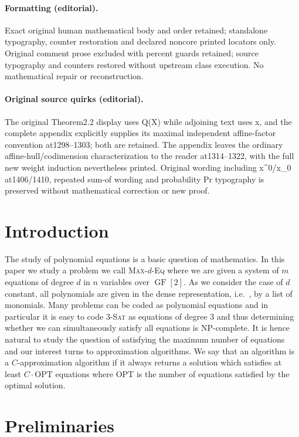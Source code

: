 \documentclass[10pt]{article}
\theoremstyle{definition}
\providecommand{\ie}{i.e.\ }
\numberwithin{equation}{section}
\newcommand{\cclass}[1]{\textsf{#1}}
\newcommand{\GF}{\operatorname{GF}}
\newcommand{\dproblem}[1]{\textsc{#1}}
\begin{document}
\paragraph{Formatting (editorial).} Exact original human mathematical body and order retained; standalone typography, counter restoration and declared noncore printed locators only. Original comment prose excluded with percent guards retained; source typography and counters restored without upstream class execution. No mathematical repair or reconstruction.
\paragraph{Original source quirks (editorial).} The original Theorem2.2 display uses Q(X) while adjoining text uses x, and the complete appendix explicitly supplies its maximal independent affine-factor convention at1298–1303; both are retained. The appendix leaves the ordinary affine-hull/codimension characterization to the reader at1314–1322, with the full new weight induction nevertheless printed. Original wording including x\textasciicircum{}0/x\_0 at1406/1410, repeated sum-of wording and probability Pr typography is preserved without mathematical correction or new proof.
\endgroup
\clearpage
\setcounter{section}{0}
\section{Introduction}

The study of polynomial equations is a basic question
of mathematics.  In this paper we study a problem we
call \dproblem{Max-$d$-Eq}
where we are given a system of $m$ equations of degree
$d$ in $n$ variables over $\GF[2]$.  As we consider the
case of $d$ constant, all polynomials are given in
the dense representation, \ie, by a list of monomials.
Many problems can be coded as polynomial equations and in particular
it is easy to code \dproblem{3-Sat} as equations of degree 3
and thus determining whether we can simultaneously
satisfy all equations is \cclass{NP}-complete.   It is hence
natural to study
the question of satisfying the %
maximum
number of
equations and our interest turns to approximation
algorithms.  We say that an algorithm is a $C$-approximation
algorithm if it always returns a solution which satisfies
at least $C \cdot \mbox{OPT}$ equations where
$\mbox{OPT}$ is the number of equations satisfied
by the optimal solution.  
\setcounter{section}{1}
\section{Preliminaries}\label{sec: prelim}
\end{document}
